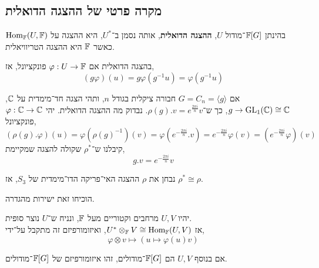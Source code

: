 \subsection{מקרה פרטי של ההצגה הדואלית}
\begin{definition}
	בהינתן $\mathbb{F}[G]$־מודול $U$, \textbf{ההצגה הדואלית}, אותה נסמן ב־$U^*$, היא ההצגה על $\operatorname{Hom}_{\mathbb{F}}(U, \mathbb{F})$ כאשר $\mathbb{F}$ היא ההצגה הטריוויאלית.
\end{definition}
בהצגה הדואלית אם $\varphi : U \to \mathbb{F}$ פונקציונל, אז,
\[
	(g \varphi)(u)
	= g \varphi(g^{-1} u)
	= \varphi(g^{-1} u)
\]
\begin{example}
	אם $G = C_n = \langle g \rangle$ חבורה ציקלית בגודל $n$, ותהי הצגה חד־מימדית על $\mathbb{C}$, $g \to \operatorname{GL}_1(\mathbb{C}) \cong \mathbb{C}$, כך ש־$\rho(g) . v = e^{\frac{2 \pi i}{n}} v$.
	נבדוק מה ההצגה הדואלית. יהי $\varphi : \mathbb{C} \to \mathbb{C}$ פונקציונל,
	\[
		(\rho(g) . \varphi)(u)
		= \varphi({\rho(g)}^{-1})(v)
		= \varphi(e^{-\frac{2 \pi i}{n}} . v)
		= e^{- \frac{2 \pi i}{n}} \varphi(v)
		= (e^{- \frac{2 \pi i}{n}} \varphi)(v)
	\]
	קיבלנו ש־$\rho^*$ שקולה להצגה שמקיימת,
	\[
		g . v
		= e^{-\frac{2 \pi i}{n}} v
	\]
\end{example}
\begin{example}
	נבחן את $\rho$ ההצגה האי־פריקה הדו־מימדית של $S_3$, אז $\rho^* \cong \rho$.
\end{example}
\begin{exercise}
	הוכיחו זאת ישירות מהגדרה.
\end{exercise}
\begin{theorem}
	יהיו $U, V$ מרחבים וקטוריים מעל $\mathbb{F}$, ונניח ש־$U$ נוצר סופית. \\
	אז $U^* \otimes_{\mathbb{F}} V \cong \operatorname{Hom}_{\mathbb{F}}(U, V)$, ואיזומורפיזם זה מתקבל על־ידי,
	\[
		\varphi \otimes v
		\mapsto (u \mapsto \varphi(u) v)
	\]

	אם בנוסף $U, V$ הם $\mathbb{F}[G]$־מודולים, זהו איזומורפיזם של $\mathbb{F}[G]$־מודולים.
\end{theorem}
